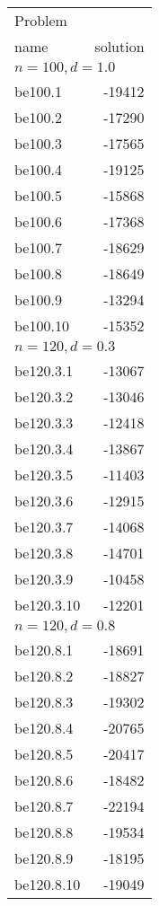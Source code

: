 \documentclass[a4paper, 12pt]{article}
\begin{document}
\begin{table}
\begin{center}
\begin{minipage}{30ex}
\begin{tabular}{|l|r|}
\hline
Problem & \\
name & solution \\
\hline
\multicolumn{2}{|l|}{$n=100, d=1.0$}\\
\hline
be100.1  & -19412 \\
be100.2  & -17290 \\
be100.3  & -17565 \\
be100.4  & -19125 \\
be100.5  & -15868 \\
be100.6  & -17368 \\
be100.7  & -18629 \\
be100.8  & -18649 \\
be100.9  & -13294 \\
be100.10 & -15352 \\
\hline
\multicolumn{2}{|l|}{$n=120, d=0.3$}\\
\hline
be120.3.1  & -13067 \\
be120.3.2  & -13046 \\
be120.3.3  & -12418 \\
be120.3.4  & -13867 \\
be120.3.5  & -11403 \\
be120.3.6  & -12915 \\
be120.3.7  & -14068 \\
be120.3.8  & -14701 \\
be120.3.9  & -10458 \\
be120.3.10 & -12201 \\
\hline
\multicolumn{2}{|l|}{$n=120, d=0.8$}\\
\hline
be120.8.1  & -18691 \\
be120.8.2  & -18827 \\
be120.8.3  & -19302 \\
be120.8.4  & -20765 \\
be120.8.5  & -20417 \\
be120.8.6  & -18482 \\
be120.8.7  & -22194 \\
be120.8.8  & -19534 \\
be120.8.9  & -18195 \\
be120.8.10 & -19049 \\
\hline
\end{tabular}
\end{minipage}

\end{center}
\end{table}
\end{document}

